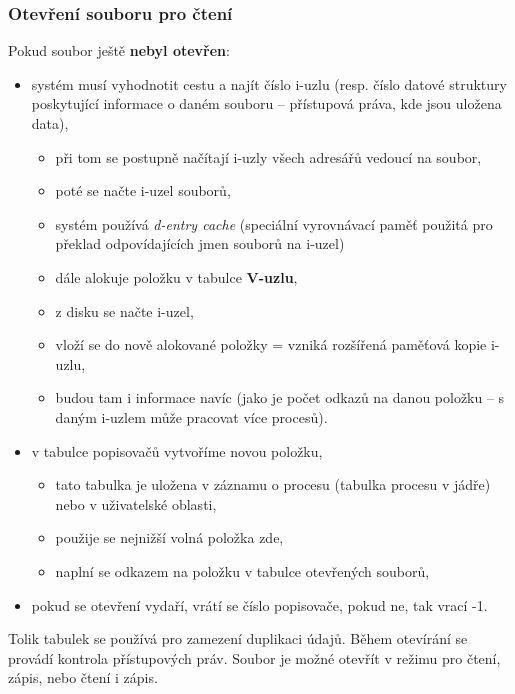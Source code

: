 \documentclass[a4paper, 11pt]{article}
\begin{document}
\subsubsection{Otevření souboru pro čtení}
Pokud soubor ještě \textbf{nebyl otevřen}:
\begin{itemize}
    \item systém musí vyhodnotit cestu a najít číslo i-uzlu (resp. číslo datové struktury poskytující informace o daném souboru -- přístupová práva, kde jsou uložena data),
    \begin{itemize}
        \item při tom se postupně načítají i-uzly všech adresářů vedoucí na soubor,
        \item poté se načte i-uzel souborů,
        \item systém používá \emph{d-entry cache} (speciální vyrovnávací paměť použitá pro překlad odpovídajících jmen souborů na i-uzel) 
        \item dále alokuje položku v tabulce \textbf{V-uzlu},
        \item z disku se načte i-uzel,
        \item vloží se do nově alokované položky = vzniká rozšířená paměťová kopie i-uzlu,
        \item budou tam i informace navíc (jako je počet odkazů na danou položku -- s daným i-uzlem může pracovat více procesů).
    \end{itemize}
    \item v tabulce popisovačů vytvoříme novou položku,
    \begin{itemize}
        \item tato tabulka je uložena v záznamu o procesu (tabulka procesu v jádře) nebo v uživatelské oblasti,
        \item použije se nejnižší volná položka zde,
        \item naplní se odkazem na položku v tabulce otevřených souborů,
    \end{itemize}
    \item pokud se otevření vydaří, vrátí se číslo popisovače, pokud ne, tak vrací -1.
\end{itemize}
 
Tolik tabulek se používá pro zamezení duplikaci údajů. Během otevírání se provádí kontrola přístupových práv. Soubor je možné otevřít v režimu pro čtení, zápis, nebo čtení i zápis.
 
\end{document}
